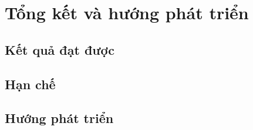 \section{Tổng kết và hướng phát triển}
\label{sec:conclusion}

\subsection{Kết quả đạt được}
\par\noindent\mbox{}\par\vspace{2mm}

\subsection{Hạn chế}
\par\noindent\mbox{}\par\vspace{2mm}

\subsection{Hướng phát triển}
\par\noindent\mbox{}\par\vspace{2mm}

